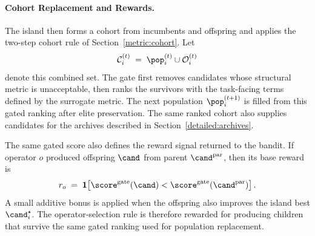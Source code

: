 \paragraph{Cohort Replacement and Rewards.}
The island then forms a cohort from incumbents and offspring and applies the two-step cohort rule of Section~\ref{metric:cohort}. Let
\[
\mathcal{C}_i^{(t)}
\;=\;
\pop_i^{(t)} \cup \mathcal{O}_i^{(t)}
\]
denote this combined set. The gate first removes candidates whose structural metric is unacceptable, then ranks the survivors with the task-facing terms defined by the surrogate metric. The next population $\pop_i^{(t+1)}$ is filled from this gated ranking after elite preservation. The same ranked cohort also supplies candidates for the archives described in Section~\ref{detailed:archives}.

The same gated score also defines the reward signal returned to the bandit. If operator $o$ produced offspring $\cand$ from parent $\cand^{\mathrm{par}}$, then its base reward is
\[
r_o
\;=\;
\mathbf{1}\!\left[
\score^{\mathrm{gate}}(\cand)
<
\score^{\mathrm{gate}}(\cand^{\mathrm{par}})
\right].
\]
A small additive bonus is applied when the offspring also improves the island best $\cand_i^\star$. The operator-selection rule is therefore rewarded for producing children that survive the same gated ranking used for population replacement.

